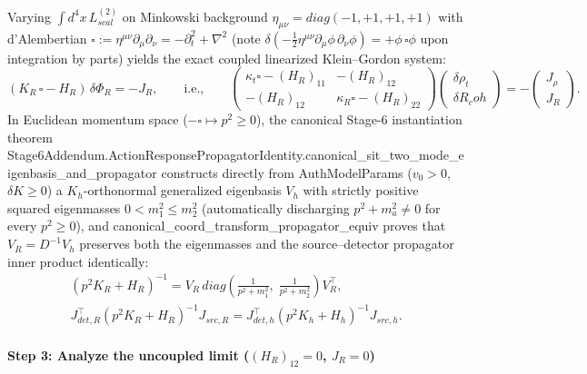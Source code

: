 \documentclass[american,11pt,letterpaper]{article}
\newcommand{\Rcoh}{R_{\mathrm{coh}}}
\def\mathcal#1{#1}%
\def\mathrm#1{#1}%
\def\texttt#1{#1}%
\def\Rcoh{R_coh}%
\begin{document}
Varying $\int d^4x\,\mathcal{L}^{(2)}_{\mathrm{scal}}$ on Minkowski background $\eta_{\mu\nu} = \mathrm{diag}(-1,+1,+1,+1)$ with d'Alembertian $\square := \eta^{\mu\nu}\partial_\mu\partial_\nu = -\partial_t^2 + \nabla^2$ (note $\delta(-\frac{1}{2}\eta^{\mu\nu}\partial_\mu\phi\,\partial_\nu\phi) = +\phi\,\square\phi$ upon integration by parts) yields the exact coupled linearized Klein--Gordon system:
\[
(K_R\,\square - H_R)\,\delta\Phi_R = -J_R,
\qquad\text{i.e.,}\qquad
\begin{pmatrix} \kappa_t\square - (H_R)_{11} & -(H_R)_{12} \\ -(H_R)_{12} & \kappa_R\square - (H_R)_{22} \end{pmatrix}
\begin{pmatrix} \delta\rho_t \\ \delta\Rcoh \end{pmatrix}
= -\begin{pmatrix} J_\rho \\ J_R \end{pmatrix}.
\]
In Euclidean momentum space ($-\square \mapsto p^2 \ge 0$), the canonical Stage-6 instantiation theorem \texttt{Stage6Addendum.\allowbreak{}ActionResponsePropagatorIdentity.\allowbreak{}canonical\_\allowbreak{}sit\_\allowbreak{}two\_\allowbreak{}mode\_\allowbreak{}eigenbasis\_\allowbreak{}and\_\allowbreak{}propagator} constructs directly from \texttt{AuthModelParams} ($v_0 > 0$, $\delta K \ge 0$) a $K_h$-orthonormal generalized eigenbasis $V_h$ with strictly positive squared eigenmasses $0 < m_1^2 \le m_2^2$ (automatically discharging $p^2 + m_a^2 \ne 0$ for every $p^2 \ge 0$), and \texttt{canonical\_\allowbreak{}coord\_\allowbreak{}transform\_\allowbreak{}propagator\_\allowbreak{}equiv} proves that $V_R = D^{-1} V_h$ preserves both the eigenmasses and the source--detector propagator inner product identically:
\begin{gather*}
(p^2 K_R + H_R)^{-1} = V_R\,\mathrm{diag}\!\left(\frac{1}{p^2 + m_1^2},\; \frac{1}{p^2 + m_2^2}\right) V_R^\top,\\[0.3em]
J_{\mathrm{det},R}^\top (p^2 K_R + H_R)^{-1} J_{\mathrm{src},R} = J_{\mathrm{det},h}^\top (p^2 K_h + H_h)^{-1} J_{\mathrm{src},h}.
\end{gather*}

\paragraph{Step 3: Analyze the uncoupled limit ($(H_R)_{12} = 0$, $J_R = 0$)}
\end{document}
